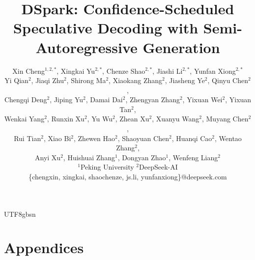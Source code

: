 \documentclass[11pt, a4paper, logo, copyright, nonumbering]{deepseek}
\title{
\centering DSpark: Confidence-Scheduled Speculative Decoding with Semi-Autoregressive Generation
}
\author[]{
Xin Cheng$^{1,2,*}$, Xingkai Yu$^{2,*}$, Chenze Shao$^{2,*}$, Jiashi Li$^{2,*}$, Yunfan Xiong$^{2,*}$

\vspace{-0.1in}
Yi Qian$^{2}$, Jiaqi Zhu$^{2}$, Shirong Ma$^{2}$, Xiaokang Zhang$^{2}$, Jiasheng Ye$^{2}$, Qinyu Chen$^{2}$,

\vspace{-0.1in}
Chengqi Deng$^{2}$, Jiping Yu$^{2}$, Damai Dai$^{2}$,  Zhengyan Zhang$^{2}$, Yixuan Wei$^{2}$, Yixuan Tan$^{2}$,

\vspace{-0.1in}
Wenkai Yang$^{2}$, Runxin Xu$^{2}$, Yu Wu$^{2}$, Zhean Xu$^{2}$, Xuanyu Wang$^{2}$, Muyang Chen$^{2}$,

\vspace{-0.1in}
Rui Tian$^{2}$,  Xiao Bi$^{2}$, Zhewen Hao$^{2}$, Shaoyuan Chen$^{2}$, Huanqi Cao$^{2}$, Wentao Zhang$^{2}$,

\vspace{-0.1in}
Anyi Xu$^{2}$, Huishuai Zhang$^{1}$, Dongyan Zhao$^{1}$, Wenfeng Liang$^{2}$ \\
\vspace{-0.1in}
\small
$^1$Peking University  \quad $^2$DeepSeek-AI \\
\small
\{chengxin, xingkai, shaochenze, js.li, yunfanxiong\}@deepseek.com


\vspace{-0.2in}
}
\begin{document}
\begin{CJK*}{UTF8}{gbsn}

\maketitle

\renewcommand{\thefootnote}{*}
\renewcommand{\thefootnote}{\arabic{footnote}}











\newpage
\appendix
\section*{Appendices}

\end{CJK*}
\end{document}

